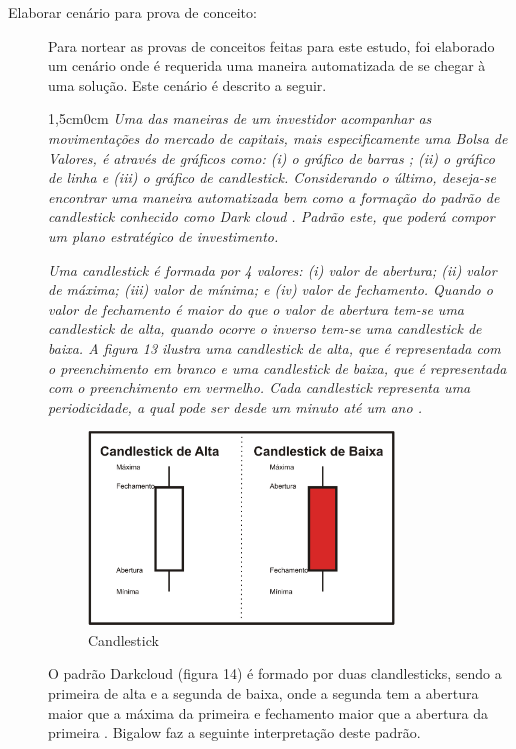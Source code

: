 \begin{description}
\item [Elaborar cenário para prova de conceito:]
Para nortear as provas de conceitos feitas para este estudo, foi elaborado um cenário onde é requerida uma maneira automatizada de se chegar à uma solução. Este cenário é descrito a seguir.

\begin{adjustwidth}{1,5cm}{0cm}
\textit{Uma das maneiras de um investidor acompanhar as movimentações do mercado de capitais, mais especificamente uma Bolsa de Valores, é através de gráficos como: (i) o gráfico de barras ; (ii) o gráfico de linha  e (iii) o gráfico de candlestick\cite[p. 5-6]{matsura2006}. Considerando o último, deseja-se encontrar uma maneira automatizada bem como a formação do padrão de candlestick conhecido como Dark cloud \cite[p.61]{matsura2006}. Padrão este, que poderá compor um plano estratégico de investimento.}

\textit{Uma candlestick é formada por 4 valores: (i) valor de abertura; (ii) valor de máxima; (iii) valor de mínima; e (iv) valor de fechamento. Quando o valor de  fechamento é maior do que o valor de abertura tem-se uma candlestick de alta, quando ocorre o inverso tem-se uma candlestick de baixa. A figura 13 ilustra uma candlestick de alta, que é representada com o preenchimento em branco e uma candlestick de baixa, que é representada com o preenchimento em vermelho. Cada candlestick representa uma periodicidade, a qual pode ser desde um minuto até um ano \cite[p.6]{matsura2006}.}
\end{adjustwidth}

\begin{figure}[h!]
\centering
\label{f13} 
\includegraphics[width=0.8\textwidth]{figuras/f10}
\caption{Candlestick }
\end{figure}

O padrão Darkcloud (figura 14) é formado por duas clandlesticks, sendo a primeira de alta e a segunda de baixa, onde a segunda tem a abertura maior que a máxima da primeira e fechamento maior que a abertura da primeira \cite[p.61]{matsura2006}. Bigalow faz a seguinte interpretação deste padrão.


\end{description}

